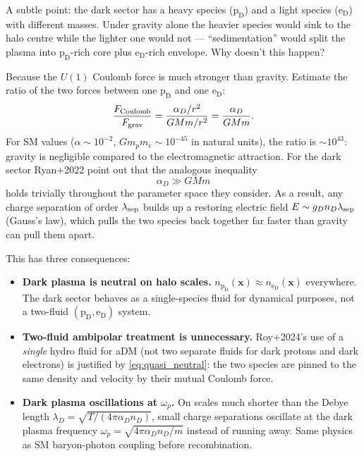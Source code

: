 \documentclass[12pt]{article}
\newcommand{\pD}{\mathrm{p_D}}
\newcommand{\eD}{\mathrm{e_D}}
\begin{document}
A subtle point: the dark sector has a heavy species ($\pD$) and a
light species ($\eD$) with different masses.  Under gravity alone the
heavier species would sink to the halo centre while the lighter one
would not --- ``sedimentation'' would split the plasma into
$\pD$-rich core plus $\eD$-rich envelope.  Why doesn't this happen?

Because the $U(1)$ Coulomb force is much stronger than gravity.
Estimate the ratio of the two forces between one $\pD$ and one $\eD$:
%
\begin{equation}
  \frac{F_{\rm Coulomb}}{F_{\rm grav}}
    = \frac{\alpha_D/r^2}{G M m/r^2}
    = \frac{\alpha_D}{G M m}.
\end{equation}
%
For SM values ($\alpha \sim 10^{-2}$, $G m_p m_e \sim 10^{-45}$ in
natural units), the ratio is $\sim 10^{43}$: gravity is negligible
compared to the electromagnetic attraction.  For the dark sector
Ryan+2022 point out that the analogous inequality
%
\begin{equation}
  \alpha_D \gg G M m
  \label{eq:quasi_neutral}
\end{equation}
%
holds trivially throughout the parameter space they consider.  As a
result, any charge separation of order $\lambda_{\rm sep}$ builds up a
restoring electric field $E \sim g_D n_D \lambda_{\rm sep}$
(Gauss's law), which pulls the two species back together far faster
than gravity can pull them apart.

This has three consequences:
%
\begin{itemize}
  \item \textbf{Dark plasma is neutral on halo scales.}
        $n_{\pD}(\mathbf{x}) \approx n_{\eD}(\mathbf{x})$ everywhere.  The dark
        sector behaves as a single-species fluid for dynamical
        purposes, not a two-fluid $(\pD, \eD)$ system.
  \item \textbf{Two-fluid ambipolar treatment is unnecessary.}
        Roy+2024's use of a \emph{single} hydro fluid for aDM (not two
        separate fluids for dark protons and dark electrons) is
        justified by \eqref{eq:quasi_neutral}: the two species are
        pinned to the same density and velocity by their mutual
        Coulomb force.
  \item \textbf{Dark plasma oscillations at $\omega_p$.}  On scales
        much shorter than the Debye length
        $\lambda_D = \sqrt{T/(4\pi\alpha_D n_D)}$, small charge
        separations oscillate at the dark plasma frequency
        $\omega_p = \sqrt{4\pi\alpha_D n_D/m}$ instead of running
        away.  Same physics as SM baryon-photon coupling before
        recombination.
\end{itemize}
\end{document}
